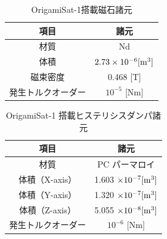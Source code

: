 \begin{table}[htb]
    \centering
    \caption{OrigamiSat-1搭載磁石諸元}
    \begin{tabular}{cc} \hline
      項目 & 諸元 \\ \hline\hline
      材質 & Nd \\
        体積 & $2.73 \times 10^{-6} [\rm{m^3}]$\\ 
        磁束密度 & 0.468 [T] \\ 
        発生トルクオーダー & $10^{-5}$ [Nm] \\ \hline   
    \end{tabular}
    \label{requirment_op}
\end{table}

\begin{table}[htb]
    \centering
    \caption{OrigamiSat-1 搭載ヒステリシスダンパ諸元}
    \begin{tabular}{cc} \hline
      項目 & 諸元 \\ \hline\hline
        材質 & PC パーマロイ \\
        体積（X-axis） & 1.603 $\times 10^{-7} [\rm{m^3}]$ \\
        体積（Y-axis） & 1.320 $\times 10^{-7} [\rm{m^3}]$ \\
        体積（Z-axis） & 5.055 $\times 10^{-8} [\rm{m^3}]$ \\ 
        発生トルクオーダー & $10^{-6}$ [Nm] \\ \hline    
    \end{tabular}
    \label{requirment_op}
\end{table}



